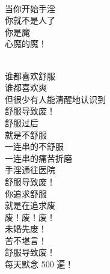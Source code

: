 \begin{poem}[你不是人]
    \begin{multicols}{3}
        \centering~\\
        当你开始手淫 \\ 你就不是人了 \\ 你是魔 \\ 心魔的魔！
    \end{multicols}
\end{poem}

\begin{poem}[舒服导致废]
    \begin{multicols}{5}
        \centering~\\
        谁都喜欢舒服 \\ 谁都喜欢爽 \\ 但很少有人能清醒地认识到 \\ 舒服导致废！ \\ 舒服过后 \\ 就是不舒服 \\ 一连串的不舒服 \\ 一连串的痛苦折磨 \\ 手淫通往医院 \\ 舒服导致废！ \\ 你追求舒服 \\ 就是在追求废 \\ 废！废！废！ \\ 未婚先废！ \\ 苦不堪言！ \\ 舒服导致废！ \\ 每天默念 500 遍！
    \end{multicols}
\end{poem}

